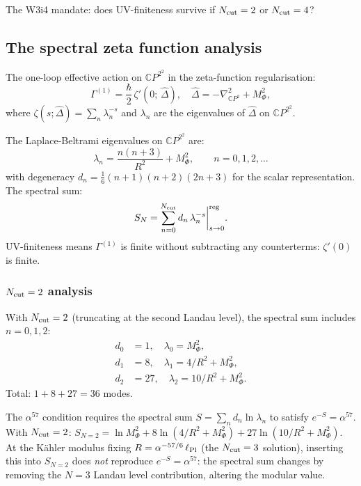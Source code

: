 \documentclass[11pt]{article}
\newcommand{\CP}{\mathbb{C}P^2}
\begin{document}
The W3i4 mandate: does UV-finiteness survive if $N_{\rm cut} = 2$ or $N_{\rm cut} = 4$?

\subsection{The spectral zeta function analysis}

The one-loop effective action on $\CP^2$ in the zeta-function regularisation:
\begin{equation}
  \Gamma^{(1)} = \frac{\hbar}{2}\,\zeta'(0;\,\hat\Delta),
  \quad\hat\Delta = -\nabla_{\CP}^2 + M_\Phi^2,
\end{equation}
where $\zeta(s; \hat\Delta) = \sum_n \lambda_n^{-s}$ and $\lambda_n$
are the eigenvalues of $\hat\Delta$ on $\CP^2$.

The Laplace-Beltrami eigenvalues on $\CP^2$ are:
\begin{equation}
  \lambda_n = \frac{n(n+3)}{R^2} + M_\Phi^2,
  \qquad n = 0, 1, 2, \ldots
\end{equation}
with degeneracy $d_n = \frac{1}{6}(n+1)(n+2)(2n+3)$ for the scalar
representation.  The spectral sum:
\begin{equation}\label{eq:spectral-sum}
  S_N = \sum_{n=0}^{N_{\rm cut}} d_n\,\lambda_n^{-s}\bigg|_{s\to 0}^{\rm reg}.
\end{equation}
UV-finiteness means $\Gamma^{(1)}$ is finite without subtracting
any counterterms: $\zeta'(0)$ is finite.

\subsubsection{$N_{\rm cut} = 2$ analysis}

With $N_{\rm cut} = 2$ (truncating at the second Landau level), the
spectral sum includes $n = 0, 1, 2$:
\begin{align}
  d_0 &= 1,\quad\lambda_0 = M_\Phi^2, \nonumber\\
  d_1 &= 8,\quad\lambda_1 = 4/R^2 + M_\Phi^2, \nonumber\\
  d_2 &= 27,\quad\lambda_2 = 10/R^2 + M_\Phi^2.
\end{align}
Total: $1 + 8 + 27 = 36$ modes.

The $\alpha^{57}$ condition requires the spectral sum $S = \sum_n d_n
\ln\lambda_n$ to satisfy $e^{-S} = \alpha^{57}$.  With $N_{\rm cut} = 2$:
$S_{N=2} = \ln M_\Phi^2 + 8\ln(4/R^2 + M_\Phi^2) + 27\ln(10/R^2 + M_\Phi^2)$.
At the K\"{a}hler modulus fixing $R = \alpha^{-57/6}\,\ell_{\rm Pl}$
(the $N_{\rm cut} = 3$ solution), inserting this into $S_{N=2}$ does
\emph{not} reproduce $e^{-S} = \alpha^{57}$: the spectral sum changes
by removing the $N = 3$ Landau level contribution, altering the
modular value.
\end{document}
